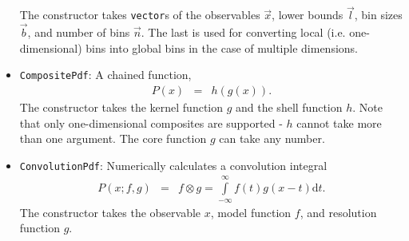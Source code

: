 \documentclass[12pt,pdflatex]{article}
\begin{document}
\begin{itemize}
The constructor
takes \texttt{vector}s of the observables $\vec x$, lower bounds $\vec l$,
bin sizes $\vec b$, and number of bins $\vec n$. The last is used for converting
local (i.e. one-dimensional) bins into global bins in the case of multiple dimensions. 
\item \texttt{CompositePdf}: A chained function, 
\begin{eqnarray}
P(x) &=& h(g(x)).
\end{eqnarray}
The constructor takes the kernel function $g$ and the shell function $h$. 
Note that only one-dimensional composites are supported - $h$ cannot take more
than one argument. The core function $g$ can take any number. 
\item \texttt{ConvolutionPdf}: Numerically calculates a convolution integral
\begin{eqnarray}
P(x;f,g) &=& f\otimes g = \int\limits_{-\infty}^\infty f(t) g(x-t) \mathrm{d}t.
\end{eqnarray}
The constructor takes the observable $x$, model function $f$, and resolution function $g$.


\end{itemize}
\end{document}
